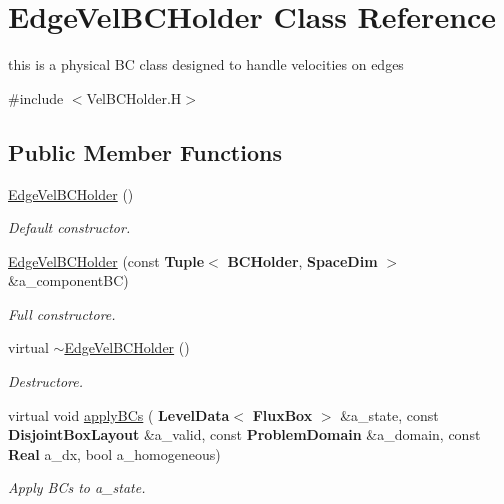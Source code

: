 \hypertarget{class_edge_vel_b_c_holder}{}\section{Edge\+Vel\+B\+C\+Holder Class Reference}
\label{class_edge_vel_b_c_holder}


this is a physical BC class designed to handle velocities on edges  




{\ttfamily \#include $<$Vel\+B\+C\+Holder.\+H$>$}

\subsection*{Public Member Functions}
\begin{DoxyCompactItemize}
\item 
\mbox{\label{class_edge_vel_b_c_holder_aa2b8fa8269461af0855bfb1730868b15}} 
\hyperlink{class_edge_vel_b_c_holder_aa2b8fa8269461af0855bfb1730868b15}{Edge\+Vel\+B\+C\+Holder} ()
\begin{DoxyCompactList}\small\item\em Default constructor. \end{DoxyCompactList}\item 
\mbox{\label{class_edge_vel_b_c_holder_acf8f3b7abd18f5d2ebbeb652fc9350ee}} 
\hyperlink{class_edge_vel_b_c_holder_acf8f3b7abd18f5d2ebbeb652fc9350ee}{Edge\+Vel\+B\+C\+Holder} (const \textbf{ Tuple}$<$ \textbf{ B\+C\+Holder}, \textbf{ Space\+Dim} $>$ \&a\+\_\+component\+BC)
\begin{DoxyCompactList}\small\item\em Full constructore. \end{DoxyCompactList}\item 
\mbox{\label{class_edge_vel_b_c_holder_aa39ae49946806857b8136aea31e3f4ce}} 
virtual \hyperlink{class_edge_vel_b_c_holder_aa39ae49946806857b8136aea31e3f4ce}{$\sim$\+Edge\+Vel\+B\+C\+Holder} ()
\begin{DoxyCompactList}\small\item\em Destructore. \end{DoxyCompactList}\item 
\mbox{\label{class_edge_vel_b_c_holder_a9e4f58cb58cbefa89c76e8f2c5edc404}} 
virtual void \hyperlink{class_edge_vel_b_c_holder_a9e4f58cb58cbefa89c76e8f2c5edc404}{apply\+B\+Cs} (\textbf{ Level\+Data}$<$ \textbf{ Flux\+Box} $>$ \&a\+\_\+state, const \textbf{ Disjoint\+Box\+Layout} \&a\+\_\+valid, const \textbf{ Problem\+Domain} \&a\+\_\+domain, const \textbf{ Real} a\+\_\+dx, bool a\+\_\+homogeneous)
\begin{DoxyCompactList}\small\item\em Apply B\+Cs to a\+\_\+state. \end{DoxyCompactList}\end{DoxyCompactItemize}
